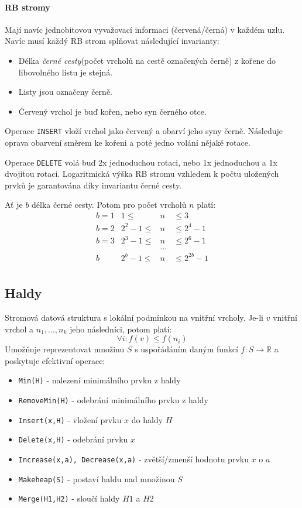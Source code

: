 \documentclass[a4paper]{article}      %
\begin{document}
\paragraph{RB stromy}
Mají navíc jednobitovou vyvažovací informaci (červená/černá) v každém uzlu. Navíc musí každý RB strom splňovat následující invarianty:
\begin{itemize}
\item Délka \emph{černé cesty}(počet vrcholů na cestě označených černě) z kořene do libovolného listu je stejná.
\item Listy jsou označeny černě.
\item Červený vrchol je buď kořen, nebo syn černého otce.
\end{itemize}

Operace \verb+INSERT+ vloží vrchol jako červený a obarví jeho syny černě.
Následuje oprava obarvení směrem ke kořeni a poté jedno volání nějaké rotace.

Operace \verb+DELETE+ volá buď 2x jednoduchou rotaci, nebo 1x jednoduchou a 1x dvojitou rotaci.
Logaritmická výška RB stromu vzhledem k počtu uložených prvků je garantována díky invariantu černé cesty.

Ať je $b$ délka černé cesty. Potom pro počet vrcholů $n$ platí:
\[
\begin{array}{lrcl}
b=1 & 1 \leq & n & \leq 3\\
b=2 & 2^{2}-1 \leq & n & \leq 2^{4}-1\\
b=3 & 2^{3}-1 \leq & n & \leq 2^{6}-1\\
    &              &\ldots & \\
b   & 2^{b}-1 \leq & n & \leq 2^{2b}-1\\
\end{array}
\]

\subsection{Haldy}Stromová datová struktura s lokální podmínkou na vnitřní vrcholy. Je-li $v$ vnitřní vrchol a $n_1,\ldots,n_k$ jeho následníci, potom platí:
\[
\forall i: f(v) \leq f(n_i)
\]
Umožňuje reprezentovat množinu $S$ s uspořádáním daným funkcí $f:S \rightarrow \mathbb{R}$ a poskytuje efektivní operace:
\begin{itemize}
\item \verb+Min(H)+ - nalezení minimálního prvku z haldy
\item \verb+RemoveMin(H)+ - odebrání minimálního prvku z haldy
\item \verb+Insert(x,H)+ - vložení prvku $x$ do haldy $H$
\item \verb+Delete(x,H)+ - odebrání prvku $x$
\item \verb+Increase(x,a), Decrease(x,a)+ - zvětší/zmenší hodnotu prvku $x$ o $a$
\item \verb+Makeheap(S)+ - postaví haldu nad množinou $S$
\item \verb+Merge(H1,H2)+ - sloučí haldy $H1$ a $H2$ 
\end{itemize}
\end{document}
